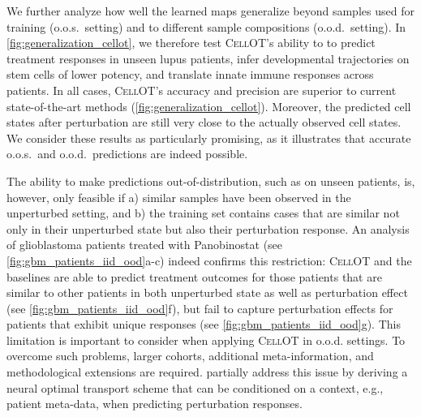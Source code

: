 We further analyze how well the learned maps generalize beyond samples used for training (o.o.s.~setting) and to different sample compositions (o.o.d.~setting). In \cref{fig:generalization_cellot}, we therefore test \textsc{CellOT}'s ability to
to predict treatment responses in unseen lupus patients, infer developmental trajectories on stem cells of lower potency, and translate innate immune responses across patients. In all cases, \textsc{CellOT}'s accuracy and precision are superior to current state-of-the-art methods (\cref{fig:generalization_cellot}). Moreover, the predicted cell states after perturbation are still very close to the actually observed cell states. We consider these results as particularly promising, as it illustrates that accurate o.o.s.~and o.o.d.~predictions are indeed possible.

\smallskip

The ability to make predictions out-of-distribution, such as on unseen patients, is, however, only feasible if a) similar samples have been observed in the unperturbed setting, and b) the training set contains cases that are similar not only in their unperturbed state but also their perturbation response.
An analysis of glioblastoma patients treated with Panobinostat \citep{zhao2021deconvolution} (see \cref{fig:gbm_patients_iid_ood}a-c) indeed confirms this restriction:
\textsc{CellOT} and the baselines are able to predict treatment outcomes for those patients that are similar to other patients in both unperturbed state as well as perturbation effect (see \cref{fig:gbm_patients_iid_ood}f), but fail to capture perturbation effects for patients that exhibit unique responses (see \cref{fig:gbm_patients_iid_ood}g).
This limitation is important to consider when applying \textsc{CellOT} in o.o.d. settings. To overcome such problems, 
larger cohorts, additional meta-information, and methodological extensions are required. \citet{bunne2022supervised} partially address this issue by deriving a neural optimal transport scheme that can be conditioned on a context, e.g., patient meta-data, when predicting perturbation responses.


